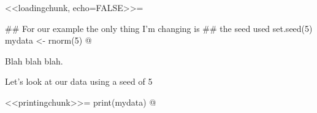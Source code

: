 \documentclass{article}
\begin{document}
 
<<loadingchunk, echo=FALSE>>=
 
## For our example the only thing I'm changing is
## the seed used
set.seed(5)
mydata <- rnorm(5)
@
 
Blah blah blah.
 
Let's look at our data using a seed of 5
 
<<printingchunk>>=
print(mydata)
@
 
\end{document}
